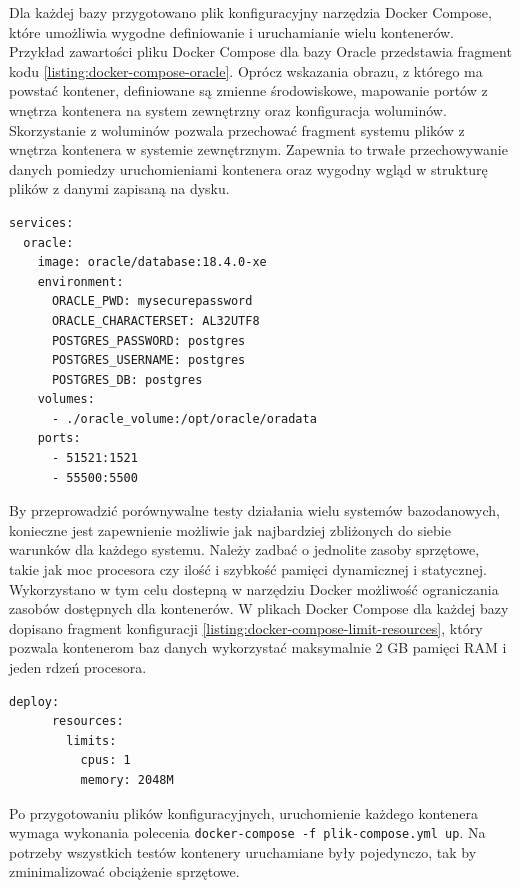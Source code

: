 \documentclass[a4paper,twoside,12pt]{book}
\begin{document}
Dla każdej bazy przygotowano plik konfiguracyjny narzędzia Docker Compose, które umożliwia wygodne definiowanie i uruchamianie wielu kontenerów. Przykład zawartości pliku Docker Compose dla bazy Oracle przedstawia fragment kodu \ref{listing:docker-compose-oracle}. Oprócz wskazania obrazu, z którego ma powstać kontener, definiowane są zmienne środowiskowe, mapowanie portów z wnętrza kontenera na system zewnętrzny oraz konfiguracja woluminów. Skorzystanie z woluminów pozwala przechować fragment systemu plików z wnętrza kontenera w systemie zewnętrznym. Zapewnia to trwałe przechowywanie danych pomiedzy uruchomieniami kontenera oraz wygodny wgląd w strukturę plików z danymi zapisaną na dysku.  

\begin{lstlisting}[style=SQL, caption={Zawartość pliku Docker Compose dla Oracle Database.}, label={listing:docker-compose-oracle}, captionpos=b]
services:      
  oracle:
    image: oracle/database:18.4.0-xe
    environment:
      ORACLE_PWD: mysecurepassword
      ORACLE_CHARACTERSET: AL32UTF8
      POSTGRES_PASSWORD: postgres
      POSTGRES_USERNAME: postgres
      POSTGRES_DB: postgres
    volumes:
      - ./oracle_volume:/opt/oracle/oradata
    ports:
      - 51521:1521
      - 55500:5500
\end{lstlisting}

By przeprowadzić porównywalne testy działania wielu systemów bazodanowych, konieczne jest zapewnienie możliwie jak najbardziej zbliżonych do siebie warunków dla każdego systemu. Należy zadbać o jednolite zasoby sprzętowe, takie jak moc procesora czy ilość i szybkość pamięci dynamicznej i statycznej. Wykorzystano w tym celu dostepną w narzędziu Docker możliwość ograniczania zasobów dostępnych dla kontenerów. W plikach Docker Compose dla każdej bazy dopisano fragment konfiguracji \ref{listing:docker-compose-limit-resources}, który pozwala kontenerom baz danych wykorzystać maksymalnie 2 GB pamięci RAM i jeden rdzeń procesora.

\begin{lstlisting}[style=SQL, caption={Konfiguracja Docker Compose dla ograniczenia zasobów sprzętowych.}, label={listing:docker-compose-limit-resources}, captionpos=b]
    deploy:
      resources:
        limits:
          cpus: 1
          memory: 2048M
\end{lstlisting}

Po przygotowaniu plików konfiguracyjnych, uruchomienie każdego kontenera wymaga wykonania polecenia \lstinline{docker-compose -f plik-compose.yml up}. Na potrzeby wszystkich testów kontenery uruchamiane były pojedynczo, tak by zminimalizować obciążenie sprzętowe.
\end{document}
